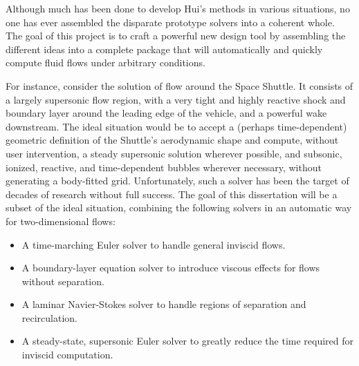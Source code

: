 \documentclass[12pt,letterpaper]{article}
\begin{document}
Although much has been done to develop Hui's methods in various
situations, no one has ever assembled the disparate prototype solvers
into a coherent whole. The goal of this project is to craft a powerful
new design tool by assembling the different ideas into a complete
package that will automatically and quickly compute fluid flows under
arbitrary conditions. 

For instance, consider the solution of flow around the Space
Shuttle. It consists of a largely supersonic flow region, with a very
tight and highly reactive shock and boundary layer around the leading
edge of the vehicle, and a powerful wake downstream. The ideal
situation would be to accept a (perhaps 
time-dependent) geometric definition of the Shuttle's aerodynamic
shape and compute, without user intervention, a steady supersonic
solution wherever possible, and subsonic, ionized, reactive, and
time-dependent bubbles wherever necessary, without 
generating a body-fitted grid. Unfortunately, such a solver has been
the target of decades of research without full success. 
The goal of
this dissertation will be a subset of the ideal situation, combining
the following solvers in an 
automatic way for two-dimensional flows:
\begin{itemize}
\item A time-marching Euler solver to handle general inviscid flows.
\item A boundary-layer equation solver to introduce
  viscous effects for flows without separation.
\item A laminar Navier-Stokes solver to handle
  regions of separation and recirculation.
\item A steady-state, supersonic Euler solver to
  greatly reduce the time required for inviscid computation.
\end{itemize}

\end{document}
